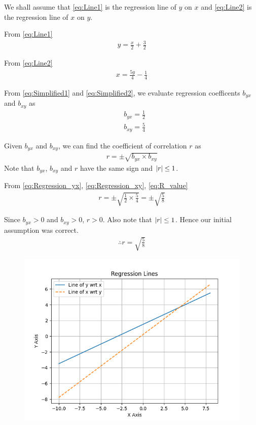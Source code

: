 \documentclass[journal,12pt,twocolumn]{IEEEtran}
\begin{document}
\solution

We shall assume that
\eqref{eq:Line1}
is the regression line of $y$ on $x$ and
\eqref{eq:Line2}
is the regression line of $x$ on $y$.

From
\eqref{eq:Line1}
\begin{align}
  y = \frac{x}{2} + \frac{3}{2}
  \label{eq:Simplified1}
\end{align}

From
\eqref{eq:Line2}
\begin{align}
  x = \frac{5y}{4} - \frac{1}{4}
  \label{eq:Simplified2}
\end{align}

From
\eqref{eq:Simplified1}
and
\eqref{eq:Simplified2},
we evaluate regression coefficents $b_{yx}$ and $b_{xy}$ as
\begin{align}
  &b_{yx} = \frac{1}{2}
  \label{eq:Regression_yx}
  \\
  &b_{xy} = \frac{5}{4}
  \label{eq:Regression_xy}
\end{align}

Given $b_{yx}$ and $b_{xy}$, we can find the coefficient of correlation $r$ as
\begin{align}
  r = \pm\sqrt{b_{yx} \times b_{xy}}
  \label{eq:R_value}
\end{align}
Note that $b_{yx}$, $b_{xy}$ and $r$ have the same sign and $\left\vert r\right\vert \le 1$.

From
\eqref{eq:Regression_yx},
\eqref{eq:Regression_xy},
\eqref{eq:R_value}
\begin{align}
  r = \pm \sqrt{\frac{1}{2} \times \frac{5}{4}} = \pm \sqrt{\frac{5}{8}}
\end{align}

Since $b_{yx} > 0$ and $b_{xy} > 0$, $r > 0$. Also note that $\left\vert r\right\vert \le 1$. Hence our initial assumption was correct.
\begin{align}
  \therefore r = \sqrt{\frac{5}{8}}
\end{align}

\begin{figure}[!ht]
  \centering
  \includegraphics[width=\columnwidth]{../figs/plot.png}
  \label{Figure_1}
\end{figure}
\end{document}
